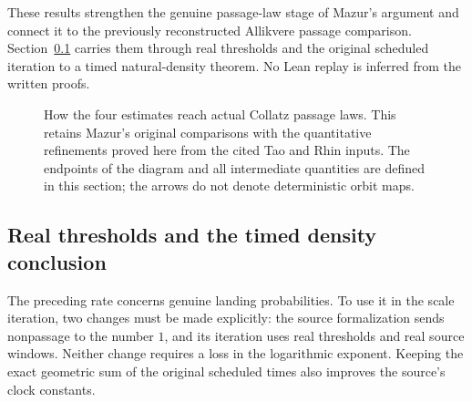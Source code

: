 These results strengthen the genuine passage-law stage of Mazur's
argument and connect it to the previously reconstructed Allikvere
passage comparison. Section~\ref{sec:Mazur-real-timed} carries them
through real thresholds and the original scheduled iteration to a
timed natural-density theorem. No Lean replay is inferred from the
written proofs.

\begin{figure}[ht]
\centering
{}
\caption{How the four estimates reach actual Collatz passage laws.
This retains Mazur's original comparisons with the quantitative
refinements proved here from the cited Tao and Rhin inputs.
The endpoints of the diagram and all intermediate quantities are defined
in this section; the arrows do not denote deterministic orbit maps.}
\label{fig:Mazur-genuine-chain}
\end{figure}

\subsection{Real thresholds and the timed density conclusion}
\label{sec:Mazur-real-timed}

The preceding rate concerns genuine landing probabilities. To use it in
the scale iteration, two changes must be made explicitly: the source
formalization sends nonpassage to the number \(1\), and its iteration
uses real thresholds and real source windows. Neither change requires
a loss in the logarithmic exponent. Keeping the exact geometric sum of
the original scheduled times also improves the source's clock constants.

